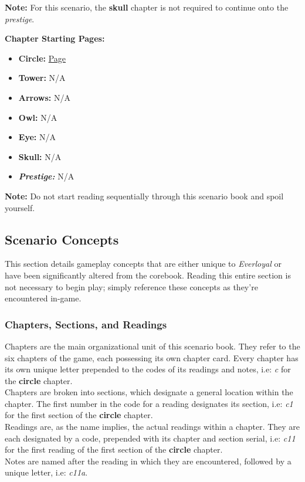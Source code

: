 \documentclass[12pt]{article}
\begin{document}
\begin{multicols*}{2}
\begin{tcolorbox}
\textbf{Note:} For this scenario, the \textbf{skull} chapter is not required to continue onto the \emph{prestige}.
\end{tcolorbox}

\textbf{Chapter Starting Pages:}
\begin{itemize}
\item \textbf{Circle:} \hyperlink{c11}{Page \pageref{c11}}
\item \textbf{Tower:} N/A %
\item \textbf{Arrows:} N/A %
\item \textbf{Owl:} N/A %
\item \textbf{Eye:} N/A %
\item \textbf{Skull:} N/A %
\item \textbf{\emph{Prestige:}} N/A %
\end{itemize}

\begin{tcolorbox}
\textbf{Note:} Do not start reading sequentially through this scenario book and spoil yourself.
\end{tcolorbox}

\vspace*{\fill}
\pagebreak

\subsection{Scenario Concepts}
This section details gameplay concepts that are either unique to \emph{Everloyal} or have been significantly altered from the corebook. Reading this entire section is not necessary to begin play; simply reference these concepts as they’re encountered in-game.

\subsubsection{Chapters, Sections, and Readings}
Chapters are the main organizational unit of this scenario book. They refer to the six chapters of the game, each possessing its own chapter card. Every chapter has its own unique letter prepended to the codes of its readings and notes, i.e: \emph{c} for the \textbf{circle} chapter.\\
Chapters are broken into sections, which designate a general location within the chapter. The first number in the code for a reading designates its section, i.e: \emph{c1} for the first section of the \textbf{circle} chapter.\\
Readings are, as the name implies, the actual readings within a chapter. They are each designated by a code, prepended with its chapter and section serial, i.e: \emph{c11} for the first reading of the first section of the \textbf{circle} chapter.\\
Notes are named after the reading in which they are encountered, followed by a unique letter, i.e: \emph{c11a}.


\end{multicols*}
\end{document}
